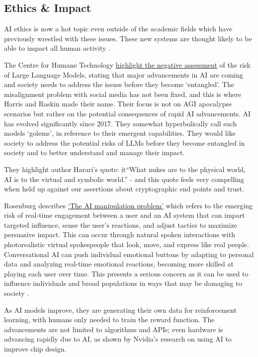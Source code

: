 \subsection{Ethics \& Impact}
AI ethics is now a hot topic even outside of the academic fields which have previously wrestled with these issues. These new systems are thought likely to be able to impact all human activity \cite{eloundou2023gpts}. \par
The Centre for Humane Technology \href{https://www.humanetech.com/key-issues}{highlight the negative assessment} of the risk of Large Language Models, stating that major advancements in AI are coming and society needs to address the issues before they become `entangled'. The misalignment problem with social media has not been fixed, and this is where Harris and Raskin made their name. Their focus is not on AGI apocalypse scenarios but rather on the potential consequences of rapid AI advancements. AI has evolved significantly since 2017. They somewhat hyperbolically call such models `golems', in reference to their emergent capabilities. They would like society to address the potential risks of LLMs before they become entangled in society and to better understand and manage their impact.\par
They highlight author \cite{harari2014sapiens} Harari's quote: it{``What nukes are to the physical world, AI is to the virtual and symbolic world.''} - and this quote feels very compelling when held up against our assertions about cryptographic end points and trust.\par
Rosenburg describes \href{https://bigthink.com/the-present/danger-conversational-ai/}{`The AI manipulation problem'} which refers to the emerging risk of real-time engagement between a user and an AI system that can impart targeted influence, sense the user's reactions, and adjust tactics to maximize persuasive impact. This can occur through natural spoken interactions with photorealistic virtual spokespeople that look, move, and express like real people. Conversational AI can push individual emotional buttons by adapting to personal data and analyzing real-time emotional reactions, becoming more skilled at playing each user over time. This presents a serious concern as it can be used to influence individuals and broad populations in ways that may be damaging to society \cite{Rosenberg2023}. \par
As AI models improve, they are generating their own data for reinforcement learning, with humans only needed to train the reward function. The advancements are not limited to algorithms and APIs; even hardware is advancing rapidly due to AI, as shown by Nvidia's research on using AI to improve chip design.\par
